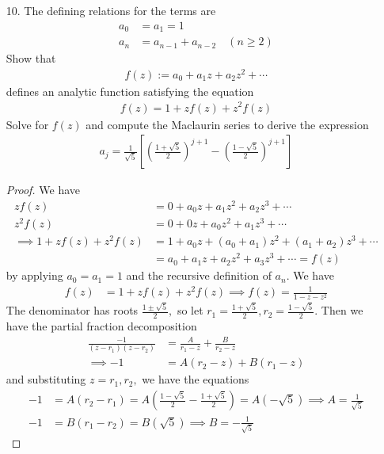 \documentclass{article}
\begin{document}
\begin{itemize}
	\item[10.] The defining relations for the terms are
		\begin{align*}
			a_0 &= a_1 = 1 \\
			a_n &= a_{n-1} + a_{n-2} \quad (n\ge 2)
		\end{align*} 
		Show that
		\begin{align*}
			f(z):=a_0+a_1z+a_2z^2+\cdots
		\end{align*}
		defines an analytic function satisfying the equation 
		\begin{align*}
			f(z)=1+zf(z)+z^2f(z)
		\end{align*}
		Solve for $f(z)$ and compute the Maclaurin series to derive the expression
		\begin{align*}
			a_j=\frac{1}{\sqrt{5}}\left[ \left( \frac{1+\sqrt{5}}{2} \right)^{j+1} - \left( \frac{1-\sqrt{5}}{2} \right)^{j+1} \right]
		\end{align*}
		\begin{proof}
			We have
			\begin{align*}
				zf(z) &= 0 + a_0z + a_1z^2 + a_2z^3 + \cdots \\
				z^2 f(z) &= 0 + 0z + a_0z^2 + a_1z^3 + \cdots \\
				\implies 1 + zf(z) + z^2f(z) &= 1 + a_0z + (a_0+a_1)z^2 + (a_1+a_2)z^3 + \cdots \\
				&= a_0 + a_1z + a_2z^2 + a_3z^3 + \cdots = f(z)
			\end{align*}
			by applying $a_0=a_1=1$ and the recursive definition of $a_n.$ We have
			\begin{align*}
				f(z) &= 1 + zf(z) + z^2f(z) \implies f(z) = \frac{1}{1-z-z^2}
			\end{align*}
			The denominator has roots $\frac{1\pm \sqrt{5}}{2},$ so let $r_1=\frac{1+\sqrt{5}}{2}, r_2=\frac{1-\sqrt{5}}{2}.$ Then we have the partial fraction decomposition
			\begin{align*}
				\frac{-1}{(z-r_1)(z-r_2)} &= \frac{A}{r_1-z} + \frac{B}{r_2-z} \\
				\implies -1 &= A(r_2-z) + B(r_1-z) 
			\end{align*}
			and substituting $z=r_1, r_2,$ we have the equations
			\begin{align*}
				-1 &= A(r_2-r_1) = A\left( \frac{1-\sqrt{5}}{2} - \frac{1+\sqrt{5}}{2} \right) = A\left(-\sqrt{5}\right) \implies A = \frac{1}{\sqrt{5}} \\
				-1 &= B(r_1-r_2) = B\left( \sqrt{5} \right)\implies B = -\frac{1}{\sqrt{5}}

\end{align*}
\end{proof}
\end{itemize}
\end{document}
